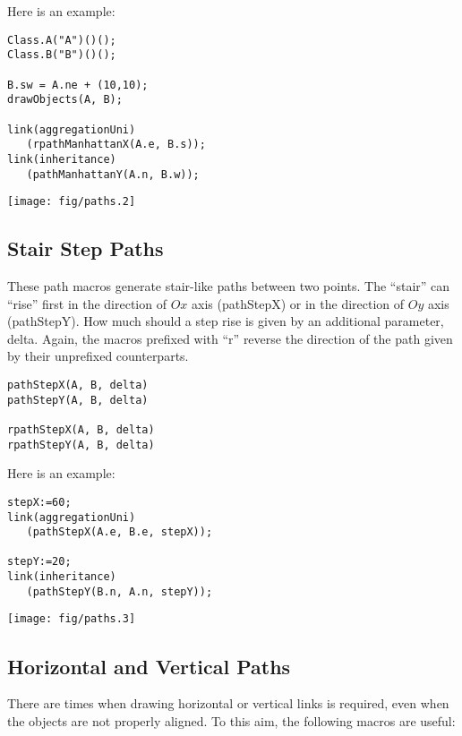 \documentclass{article}
\newcommand{\code}{\ttfamily}
\begin{document}
\pagebreak
Here is an example:

\begin{multicols}{2}
\begin{verbatim}
Class.A("A")()();
Class.B("B")()();

B.sw = A.ne + (10,10);
drawObjects(A, B);

link(aggregationUni)
   (rpathManhattanX(A.e, B.s));
link(inheritance)
   (pathManhattanY(A.n, B.w));
\end{verbatim}
\columnbreak
\hspace{1cm}\texttt{[image: fig/paths.2]}
\end{multicols}

\subsection{Stair Step Paths}

These path macros generate stair-like paths between two points.
The ``stair'' can ``rise'' first in the direction of $Ox$ axis ({\code pathStepX})
or in the direction of $Oy$ axis ({\code pathStepY}). How much should a step
rise is given by an additional parameter, {\code delta}. Again, the macros
prefixed with ``{\code r}'' reverse the direction of the path given by their
unprefixed counterparts.

\begin{verbatim}
pathStepX(A, B, delta)
pathStepY(A, B, delta)

rpathStepX(A, B, delta)
rpathStepY(A, B, delta)
\end{verbatim}

Here is an example:

\begin{multicols}{2}
\begin{verbatim}
stepX:=60;
link(aggregationUni)
   (pathStepX(A.e, B.e, stepX));

stepY:=20;
link(inheritance)
   (pathStepY(B.n, A.n, stepY));
\end{verbatim}
\columnbreak
\hspace{1cm}\texttt{[image: fig/paths.3]}
\end{multicols}

\subsection{Horizontal and Vertical Paths}

There are times when drawing horizontal or vertical links is required,
even when the objects are not properly aligned. To this aim, the following macros
are useful:
\end{document}
